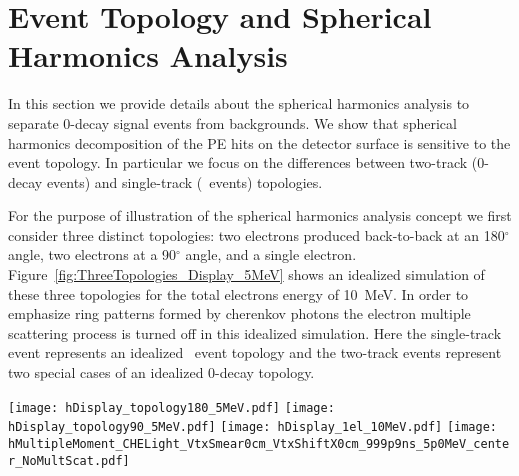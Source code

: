 \section{Event Topology and Spherical Harmonics Analysis}
\label{sec:topology_and_harmonics}

In this section we provide details about the spherical harmonics analysis to separate 0\nbb-decay signal events from backgrounds. 
We show that spherical harmonics decomposition of the PE hits on the detector surface is sensitive to the event topology. In particular
we focus on the differences between two-track (0\nbb-decay events) and single-track (\B~events) topologies.

For the purpose of illustration of the spherical harmonics analysis concept we first consider three distinct topologies: 
two electrons produced back-to-back at an 180$^{\circ}$ angle, two electrons at a 90$^{\circ}$ angle, and a single electron.
Figure~\ref{fig:ThreeTopologies_Display_5MeV} shows an idealized simulation of these three topologies for the total electrons 
energy of 10~MeV. In order to emphasize ring patterns formed by cherenkov photons the electron multiple scattering process is turned off
in this idealized simulation. Here the single-track event represents an idealized \B~event topology and the two-track events represent
two special cases of an idealized 0\nbb-decay topology.


\begin{figure*}[h]
  \centering
  \texttt{[image: hDisplay\_topology180\_5MeV.pdf]}
  \texttt{[image: hDisplay\_topology90\_5MeV.pdf]}
  \texttt{[image: hDisplay\_1el\_10MeV.pdf]}
  \texttt{[image: hMultipleMoment\_CHELight\_VtxSmear0cm\_VtxShiftX0cm\_999p9ns\_5p0MeV\_center\_NoMultScat.pdf]}
  \caption{\emph{Top row:} Idealized event displays for the three representative event topologies: two back-to-back
    5~MeV electrons (\emph{left}), two 5~MeV electrons at 90$^{\circ}$ angle (\emph{middle}), and a single 10~MeV electron
    (\emph{center}). Multiple scattering is turned off in the simulation to emphasize the difference in the mutual orientation of
    cherenkov rings for the three topologies. For the illustration purposes 100\% QE is applied to cherenkov photons (triangles)
    and the default QE is applied to scintillation photons (dots). All electrons originate at the center of the
    detector. One typical event is shown for each topology.
    \emph{Bottom pannel:} Normalized power spectrum $S_l$ calculated for distribution of cherenkov photons only. The three
    topologies are compared: two back-to-back 5~MeV electrons (\emph{solid red line}), two 5~MeV electrons at 90$^{\circ}$ angle
    (\emph{dotted magenta line}), and a single 10~MeV electron (\emph{dashed blue line}).}
  \label{fig:ThreeTopologies_Display_5MeV}
\end{figure*}



